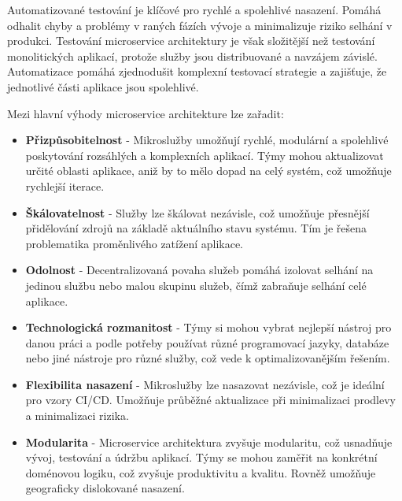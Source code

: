 Automatizované testování je klíčové pro rychlé a spolehlivé nasazení. Pomáhá odhalit chyby a problémy v raných fázích vývoje a minimalizuje riziko selhání v produkci. Testování microservice architektury je však složitější než testování monolitických aplikací, protože služby jsou distribuované a navzájem závislé. Automatizace pomáhá zjednodušit komplexní testovací strategie a zajišťuje, že jednotlivé části aplikace jsou spolehlivé. \cite{Newman2015}


Mezi hlavní výhody microservice architekture lze zařadit:

\begin{itemize}

\item \textbf{Přizpůsobitelnost} - Mikroslužby umožňují rychlé, modulární a spolehlivé poskytování rozsáhlých a komplexních aplikací. Týmy mohou aktualizovat určité oblasti aplikace, aniž by to mělo dopad na celý systém, což umožňuje rychlejší iterace.

\item \textbf{Škálovatelnost} - Služby lze škálovat nezávisle, což umožňuje přesnější přidělování zdrojů na základě aktuálního stavu systému. Tím je řešena problematika proměnlivého zatížení aplikace.

\item \textbf{Odolnost} - Decentralizovaná povaha služeb pomáhá izolovat selhání na jedinou službu nebo malou skupinu služeb, čímž zabraňuje selhání celé aplikace.

\item \textbf{Technologická rozmanitost} - Týmy si mohou vybrat nejlepší nástroj pro danou práci a podle potřeby používat různé programovací jazyky, databáze nebo jiné nástroje pro různé služby, což vede k optimalizovanějším řešením.

\item \textbf{Flexibilita nasazení} - Mikroslužby lze nasazovat nezávisle, což je ideální pro vzory CI/CD. Umožňuje průběžné aktualizace při minimalizaci prodlevy a minimalizaci rizika.

\item \textbf{Modularita} - Microservice architektura zvyšuje modularitu, což usnadňuje vývoj, testování a údržbu aplikací. Týmy se mohou zaměřit na konkrétní doménovou logiku, což zvyšuje produktivitu a kvalitu. Rovněž umožňuje geograficky dislokované nasazení.

\end{itemize}

